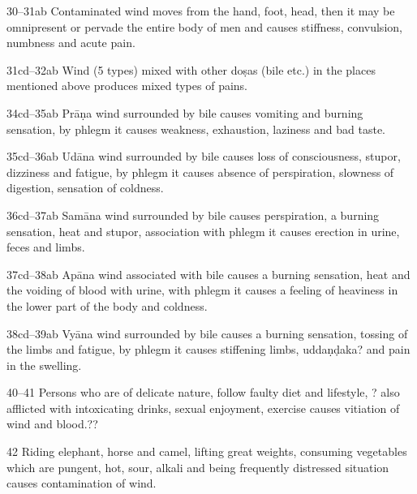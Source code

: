 \begin{translation}
{\item[30--31ab] Contaminated wind moves from the hand, foot, head, then it 
may be omnipresent or pervade the entire body of men and causes stiffness, 
convulsion, numbness and acute pain.

\item[31cd--32ab] Wind (5 types) mixed with other doṣas (bile etc.) in the 
places mentioned above produces mixed types of pains.

\item[34cd--35ab] Prāṇa wind surrounded by bile causes vomiting and burning 
sensation, by phlegm it causes weakness, exhaustion, laziness and bad taste. 

\item[35cd--36ab] Udāna wind surrounded by bile causes loss of 
consciousness, stupor, dizziness and fatigue, by phlegm it causes absence of 
perspiration, slowness of digestion, sensation of coldness.

\item[36cd--37ab] Samāna wind surrounded by bile causes perspiration, a 
burning sensation, heat and stupor, association with phlegm it causes erection 
in 
urine, feces and limbs.  

\item[37cd--38ab] Apāna wind associated with bile causes a burning sensation, 
heat and the voiding of blood with urine, with phlegm it causes a feeling of 
heaviness in the lower part of the body and coldness.

\item[38cd--39ab] Vyāna wind surrounded by bile causes a burning sensation, 
tossing of the limbs and fatigue, by phlegm it causes stiffening limbs, 
uddaṇḍaka? and pain in the swelling.

\item[40--41] Persons who are of delicate nature, follow faulty diet and lifestyle, ? also afflicted with intoxicating drinks, 	sexual enjoyment, exercise causes vitiation of wind and blood.??

\item[42] Riding elephant, horse and camel, lifting great weights, consuming vegetables which are pungent, hot, sour, alkali and being frequently distressed situation causes contamination of wind. 

}
\end{translation}

